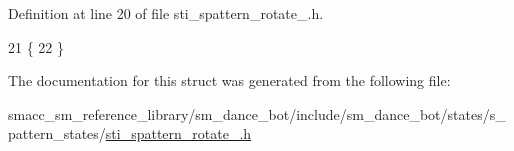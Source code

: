 Definition at line 20 of file sti\+\_\+spattern\+\_\+rotate\+\_.\+h.


\begin{DoxyCode}
21     \{
22     \}
\end{DoxyCode}


The documentation for this struct was generated from the following file\+:\begin{DoxyCompactItemize}
\item 
smacc\+\_\+sm\+\_\+reference\+\_\+library/sm\+\_\+dance\+\_\+bot/include/sm\+\_\+dance\+\_\+bot/states/s\+\_\+pattern\+\_\+states/\hyperlink{include_2sm__dance__bot_2states_2s__pattern__states_2sti__spattern__rotate__1_8h}{sti\+\_\+spattern\+\_\+rotate\+\_.\+h}\end{DoxyCompactItemize}
